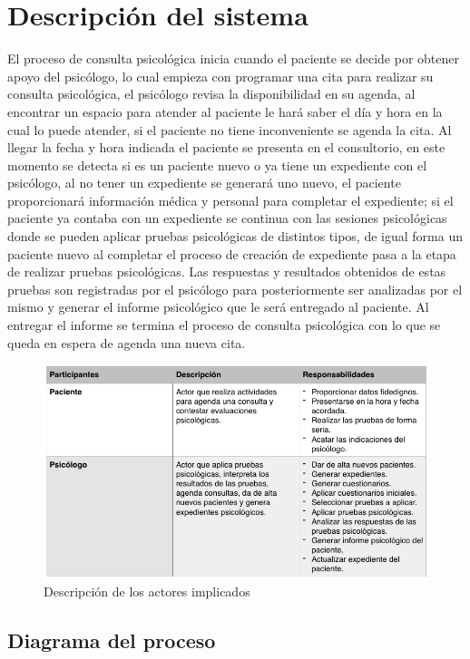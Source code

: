 \section{Descripción del sistema}

El proceso de consulta psicológica inicia cuando el paciente se decide por obtener apoyo del psicólogo, lo cual empieza con programar una cita para realizar su consulta psicológica, el psicólogo revisa la disponibilidad en su agenda, al encontrar un espacio para atender al paciente le hará saber el día y hora en la cual lo puede atender, si el paciente no tiene inconveniente se agenda la cita. Al llegar la fecha y hora indicada el paciente se presenta en el consultorio, en este momento se detecta si es un paciente nuevo o ya tiene un expediente con el psicólogo, al no tener un expediente se generará uno nuevo, el paciente proporcionará información médica y personal para completar el expediente; si el paciente ya contaba con un expediente se continua con las sesiones psicológicas donde se pueden aplicar pruebas psicológicas de distintos tipos, de igual forma un paciente nuevo al completar el proceso de creación de expediente pasa a la etapa de realizar pruebas psicológicas. Las respuestas y resultados obtenidos de estas pruebas son registradas por el psicólogo para posteriormente ser analizadas por el mismo y generar el informe psicológico que le será entregado al paciente.
Al entregar el informe se termina el proceso de consulta psicológica con lo que se queda en espera de agenda una nueva cita.

\begin{figure}[H]
\centering
\includegraphics[width=\textwidth]{imagenes/actores}
\caption{Descripción de los actores implicados}
\label{img:actores}
\end{figure}

\subsection{Diagrama del proceso}


